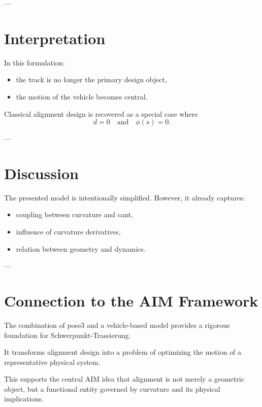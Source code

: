 ---

\section{Interpretation}

\begin{remark}
In this formulation:
\begin{itemize}
\item the track is no longer the primary design object,
\item the motion of the vehicle becomes central.
\end{itemize}
\end{remark}

\begin{remark}
Classical alignment design is recovered as a special case where
\[
d=0
\quad \text{and} \quad
\phi(s)=0.
\]
\end{remark}

---

\section{Discussion}

\begin{remark}
The presented model is intentionally simplified.
However, it already captures:
\begin{itemize}
\item coupling between curvature and cant,
\item influence of curvature derivatives,
\item relation between geometry and dynamics.
\end{itemize}
\end{remark}




---

\section{Connection to the AIM Framework}

\begin{summary}
The combination of pose3 and a vehicle-based model provides a rigorous
foundation for Schwerpunkt-Trassierung.

It transforms alignment design into a problem of optimizing the motion
of a representative physical system.

This supports the central AIM idea that alignment is not merely a
geometric object, but a functional entity governed by curvature and
its physical implications.
\end{summary}
